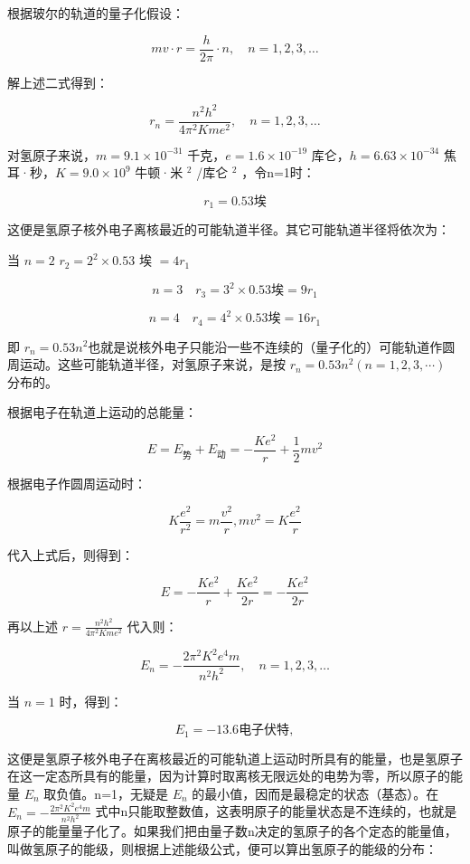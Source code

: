 根据玻尔的轨道的量子化假设：

\[
m v \cdot r = \frac {h}{2 \pi} \cdot n, \quad n = 1, 2, 3, \dots
\]

解上述二式得到：

\[
r _ {n} = \frac {n ^ {2} h ^ {2}}{4 \pi^ {2} K m e ^ {2}}, \quad n = 1, 2, 3, \dots
\]

对氢原子来说，\(m=9.1\times10^{-31}\) 千克，\(e=1.6\times10^{-19}\)
库仑，\(h=6.63\times10^{-34}\) 焦耳·秒，\(K=9.0\times10^{9}\) 牛顿·米
\(^{2}\) /库仑 \(^{2}\) ，令n=1时：

\[
r _ {1} = 0.53 \text{埃}
\]

这便是氢原子核外电子离核最近的可能轨道半径。其它可能轨道半径将依次为：

当 \(n = 2\) \(r_2 = 2^2 \times 0.53\) 埃 \(= 4r_1\)

\[
n = 3 \quad r _ {3} = 3 ^ {2} \times 0.53 \text{埃} = 9 r _ {1}
\]

\[
n = 4 \quad r _ {4} = 4 ^ {2} \times 0.53 \text{埃} = 16 r _ {1}
\]

即
\(r_n = 0.53n^2\)也就是说核外电子只能沿一些不连续的（量子化的）可能轨道作圆周运动。这些可能轨道半径，对氢原子来说，是按
\(r_{n}=0.53n^{2}(n=1,2,3,\cdots)\) 分布的。

根据电子在轨道上运动的总能量：

\[
E = E _ {\text{势}} + E _ {\text{动}} = - \frac {K e ^ {2}}{r} + \frac {1}{2} m v ^ {2}
\]

根据电子作圆周运动时：

\[
K \frac {e ^ {2}}{r ^ {2}} = m \frac {v ^ {2}}{r}, m v ^ {2} = K \frac {e ^ {2}}{r}
\]

代入上式后，则得到：

\[
E = - \frac {K e ^ {2}}{r} + \frac {K e ^ {2}}{2 r} = - \frac {K e ^ {2}}{2 r}
\]

再以上述 \(r = \frac{n^2h^2}{4\pi^2Kme^2}\) 代入则：

\[
E _ {n} = - \frac {2 \pi^ {2} K ^ {2} e ^ {4} m}{n ^ {2} h ^ {2}}, \quad n = 1, 2, 3, \dots
\]

当 \(n = 1\) 时，得到：

\[
E _ {1} = - 13.6 \text{电子伏特},
\]

这便是氢原子核外电子在离核最近的可能轨道上运动时所具有的能量，也是氢原子在这一定态所具有的能量，因为计算时取离核无限远处的电势为零，所以原子的能量
\(E_{n}\) 取负值。n=1，无疑是 \(E_{n}\)
的最小值，因而是最稳定的状态（基态）。在
\(E_{n}=-\frac{2\pi^{2}K^{2}e^{4}m}{n^{2}h^{2}}\)
式中n只能取整数值，这表明原子的能量状态是不连续的，也就是原子的能量量子化了。如果我们把由量子数n决定的氢原子的各个定态的能量值，叫做氢原子的能级，则根据上述能级公式，便可以算出氢原子的能级的分布：

